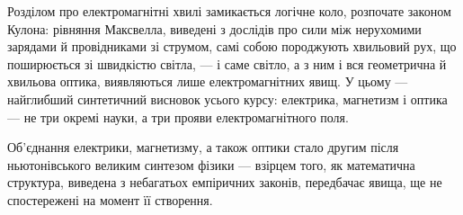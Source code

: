 Розділом про електромагнітні хвилі замикається логічне коло, розпочате законом Кулона: рівняння Максвелла, виведені з дослідів про сили між нерухомими зарядами й провідниками зі струмом, самі собою породжують хвильовий рух, що поширюється зі швидкістю світла, --- і саме світло, а з ним і вся геометрична й хвильова оптика, виявляються лише  електромагнітних явищ. У цьому --- найглибший синтетичний висновок усього курсу: електрика, магнетизм і оптика --- не три окремі науки, а три прояви  електромагнітного поля.

Об'єднання електрики, магнетизму, а також оптики стало другим після ньютонівського великим синтезом фізики --- взірцем того, як математична структура, виведена з небагатьох емпіричних законів, передбачає явища, ще не спостережені на момент її створення.

%



